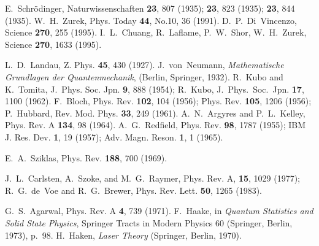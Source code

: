 \documentclass[12pt,twoside,a4paper]{report}
\begin{document}
{\begin{thebibliography}{999}
 E.~Schr\"{o}dinger, Naturwissenschaften {\bf 23}, 807 (1935); {\bf 23}, 823 (1935); {\bf 23}, 844 (1935).  
  W.~H.~Zurek, Phys. Today {\bf44}, No.10, 36 (1991).  
  D.~P.~Di~Vincenzo, Science {\bf 270}, 255 (1995).  
 I.~L.~Chuang, R.~Laflame, P.~W.~Shor, W.~H.~Zurek, Science {\bf 270}, 1633  (1995).  




 L.~D.~Landau, Z. Phys. {\bf 45}, 430 (1927).
 J.~von~Neumann, {\it Mathematische Grundlagen 
                 der Quantenmechanik}, (Berlin, Springer, 1932).
 R.~Kubo and K.~Tomita, J.~Phys. Soc. Jpn. {\bf 9}, 888 (1954);
                 R.~Kubo, J.~Phys.~Soc.~Jpn. {\bf 17}, 1100 (1962).
 F.~Bloch, Phys. Rev. {\bf 102}, 104  (1956);
                 Phys. Rev. {\bf 105}, 1206 (1956);
                 P.~Hubbard, Rev. Mod. Phys. {\bf 33}, 249 (1961).
 A.~N.~Argyres and P.~L.~Kelley, 
                 Phys. Rev. A {\bf 134}, 98 (1964).
 A.~G.~Redfield, Phys. Rev. {\bf 98}, 1787 (1955);
                 IBM J. Res. Dev. {\bf 1}, 19 (1957);
                 Adv. Magn. Reson. {\bf 1}, 1 (1965).

 E.~A.~Sziklas, Phys. Rev. {\bf 188}, 700 (1969).


 J.~L.~Carlsten, A.~Szoke, and M.~G.~Raymer,
                 Phys. Rev. A, {\bf 15}, 1029 (1977);
                 R.~G.~de~Voe and R.~G.~Brewer,
                 Phys. Rev. Lett. {\bf 50}, 1265 (1983).

 G.~S.~Agarwal, Phys. Rev. A {\bf 4}, 739 (1971).
 F.~Haake, in {\it Quantum Statistics and Solid State Physics},
                 Springer Tracts in Modern Physics 60 (Springer, Berlin, 1973), p.~98.
 H.~Haken, {\it Laser Theory} (Springer, Berlin, 1970).


\end{thebibliography}}
\end{document}

